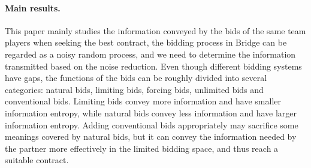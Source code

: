 \documentclass[11pt]{article}
\begin{document}
\paragraph{Main results.}
This paper mainly studies the information conveyed by the bids of the same team players when seeking the best contract, the bidding process in Bridge can be regarded as a noisy random process, and we need to determine the information transmitted based on the noise reduction. Even though different bidding systems have gaps, the functions of the bids can be roughly divided into several categories: natural bids, limiting bids, forcing bids, unlimited bids and conventional bids. Limiting bids convey more information and have smaller information entropy, while natural bids convey less information and have larger information entropy. Adding conventional bids appropriately may sacrifice some meanings covered by natural bids, but it can convey the information needed by the partner more effectively in the limited bidding space, and thus reach a suitable contract.


\end{document}
